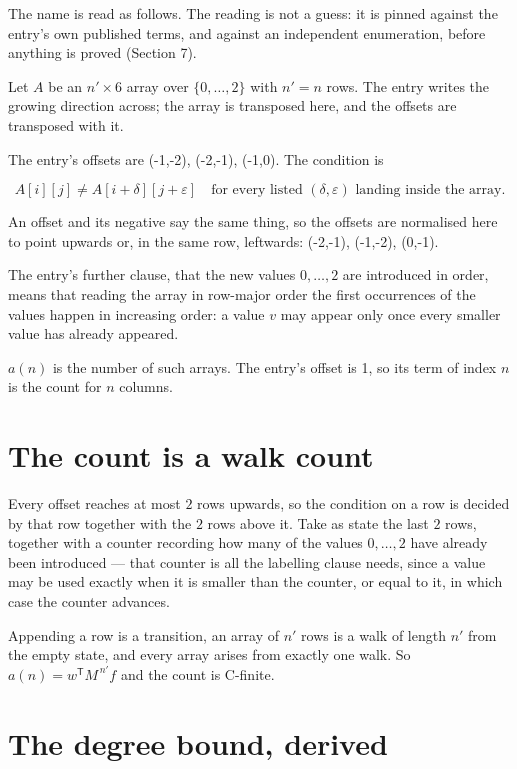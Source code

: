 \documentclass[11pt]{article}
\theoremstyle{definition}
\begin{document}
The name is read as follows. The reading is not a guess: it is pinned against the entry's own published terms, and against an independent enumeration, before anything is proved (Section 7).

Let $A$ be an $n' \times 6$ array over $\{0,\dots,2\}$ with $n' = n$ rows. The entry writes the growing direction across; the array is transposed here, and the offsets are transposed with it.

The entry's offsets are (-1,-2), (-2,-1), (-1,0). The condition is

\[A[i][j] \ne A[i{+}\delta][j{+}\varepsilon]\quad\text{for every listed }(\delta,\varepsilon)\text{ landing inside the array.}\]

An offset and its negative say the same thing, so the offsets are normalised here to point upwards or, in the same row, leftwards: (-2,-1), (-1,-2), (0,-1).

The entry's further clause, that the new values $0,\dots,2$ are introduced in order, means that reading the array in row-major order the first occurrences of the values happen in increasing order: a value $v$ may appear only once every smaller value has already appeared.

$a(n)$ is the number of such arrays. The entry's offset is 1, so its term of index $n$ is the count for $n$ columns.

\section{The count is a walk count}

Every offset reaches at most $2$ rows upwards, so the condition on a row is decided by that row together with the $2$ rows above it. Take as state the last $2$ rows, together with a counter recording how many of the values $0,\dots,2$ have already been introduced --- that counter is all the labelling clause needs, since a value may be used exactly when it is smaller than the counter, or equal to it, in which case the counter advances.

Appending a row is a transition, an array of $n'$ rows is a walk of length $n'$ from the empty state, and every array arises from exactly one walk. So $a(n) = w^{\mathsf T}M^{\,n'}f$ and the count is C-finite.

\section{The degree bound, derived}
\end{document}
